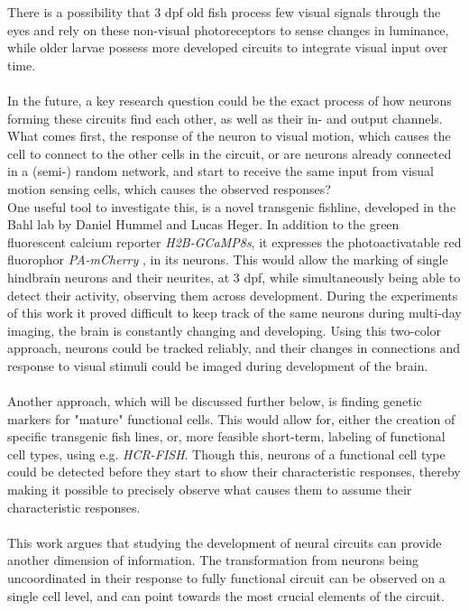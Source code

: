 \documentclass[12pt, a4paper, oneside]{article}
\begin{document}
There is a possibility that 3 dpf old fish process few visual signals through the eyes and rely on these non-visual photoreceptors to sense changes in luminance, while older larvae possess more developed circuits to integrate visual input over time.\\
\\
In the future, a key research question could be the exact process of how neurons forming these circuits find each other, as well as their in- and output channels.\\
What comes first, the response of the neuron to visual motion, which causes the cell to connect to the other cells in the circuit, or are neurons already connected in a (semi-) random network, and start to receive the same input from visual motion sensing cells, which causes the observed responses?\\
One useful tool to investigate this, is a novel transgenic fishline, developed in the Bahl lab by Daniel Hummel and Lucas Heger. In addition to the green fluorescent calcium reporter \textit{H2B-GCaMP8s}, it expresses the photoactivatable red fluorophor \textit{PA-mCherry} \parencite{subachPhotoactivatableMCherryHighresolution2009}, in its neurons. This would allow the marking of single hindbrain neurons and their neurites, at 3 dpf, while simultaneously being able to detect their activity, observing them across development. During the experiments of this work it proved difficult to keep track of the same neurons during multi-day imaging, the brain is constantly changing and developing. Using this two-color approach, neurons could be tracked reliably, and their changes in connections and response to visual stimuli could be imaged during development of the brain.\\
\\
Another approach, which will be discussed further below, is finding genetic markers for "mature" functional cells. This would allow for, either the creation of specific transgenic fish lines, or, more feasible short-term, labeling of functional cell types, using e.g. \textit{HCR-FISH}. Though this, neurons of a functional cell type could be detected before they start to show their characteristic responses, thereby making it possible to precisely observe what causes them to assume their characteristic responses.\\
\\
This work argues that studying the development of neural circuits can provide another dimension of information. The transformation from neurons being uncoordinated in their response to fully functional circuit can be observed on a single cell level, and can point towards the most crucial elements of the circuit.\\
\end{document}

